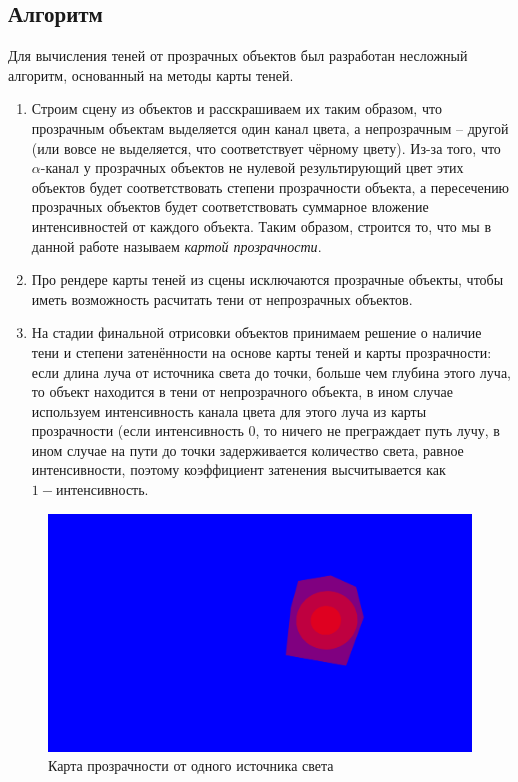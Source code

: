 \documentclass[12pt, a4paper] {ncc}
\begin{document}
	\subsection{Алгоритм}
		Для вычисления теней от прозрачных объектов был разработан несложный алгоритм,
		основанный на методы карты теней.
		\begin{enumerate}
			\item Строим сцену из объектов и расскрашиваем их таким образом, что прозрачным объектам
			   выделяется один канал цвета, а непрозрачным -- другой (или вовсе не выделяется, что
			   соответствует чёрному цвету). Из-за того, что $\alpha$-канал у прозрачных объектов не
			   нулевой результирующий цвет этих объектов будет соответствовать степени прозрачности
			   объекта, а пересечению прозрачных объектов будет соответствовать суммарное вложение
			   интенсивностей от каждого объекта. Таким образом, строится то, что мы в данной работе
			   называем \textit{картой прозрачности}.
			\item Про рендере карты теней из сцены исключаются прозрачные объекты, чтобы иметь возможность
			   расчитать тени от непрозрачных объектов.
			\item На стадии финальной отрисовки объектов принимаем решение о наличие тени и степени затенённости
			   на основе карты теней и карты прозрачности: если длина луча от источника света до точки, больше
			   чем глубина этого луча, то объект находится в тени от непрозрачного объекта, в ином случае
			   используем интенсивность канала цвета для этого луча из карты прозрачности (если интенсивность 0,
			   то ничего не преграждает путь лучу, в ином случае на пути до точки задерживается количество
			   света, равное интенсивности, поэтому коэффициент затенения высчитывается как $1 - \text{интенсивность}$.
		\end{enumerate}

		\begin{figure}[ht]
        	\includegraphics[scale=0.3]{./scene_transp_map.png}
			\caption{Карта прозрачности от одного источника света}
		\end{figure}
\end{document}
